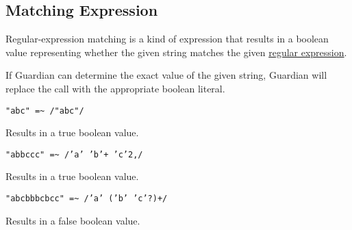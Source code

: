 
\subsection{Matching Expression}
{
	Regular-expression matching is a kind of expression that results in
	a boolean value representing whether the given string matches
	the given \hyperref[sec:regex]{regular expression}.
	
	If Guardian can determine the exact value of the given string,
	Guardian will replace the call with the appropriate boolean literal.
	
	\begin{itemize}
	{
		\item[] \texttt{"abc" =\~{} /"abc"/}
		
			Results in a true boolean value.
		
		\item[] \texttt{"abbccc" =\~{} /'a' 'b'+ 'c'{2,}/}
		
			Results in a true boolean value.
		
		\item[] \texttt{"abcbbbcbcc" =\~{} /'a' ('b' 'c'?)+/}
		
			Results in a false boolean value.
	}
	\end{itemize}
}
